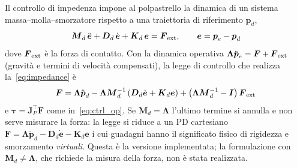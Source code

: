 Il controllo di impedenza impone al polpastrello la dinamica di un sistema massa--molla--smorzatore rispetto a una traiettoria di riferimento $\boldsymbol p_d$,
\begin{equation}
    \boldsymbol M_d\,\ddot{\boldsymbol e}+\boldsymbol D_d\,\dot{\boldsymbol e}+\boldsymbol K_d\,\boldsymbol e=\boldsymbol F_{\rm ext},\qquad \boldsymbol e=\boldsymbol p_e-\boldsymbol p_d
    \label{eq:impedance}
\end{equation}
dove $\boldsymbol F_{\rm ext}$ è la forza di contatto. Con la dinamica operativa $\boldsymbol\Lambda\ddot{\boldsymbol p}_e=\boldsymbol F+\boldsymbol F_{\rm ext}$ (gravità e termini di velocità compensati), la legge di controllo che realizza la~\eqref{eq:impedance} è
\begin{equation}
    \boldsymbol F=\boldsymbol\Lambda\ddot{\boldsymbol p}_d-\boldsymbol\Lambda\boldsymbol M_d^{-1}\left(\boldsymbol D_d\dot{\boldsymbol e}+\boldsymbol K_d\boldsymbol e\right)+\left(\boldsymbol\Lambda\boldsymbol M_d^{-1}-\boldsymbol I\right)\boldsymbol F_{\rm ext}
\end{equation}
e $\boldsymbol\tau=\boldsymbol J_P^\top\boldsymbol F$ come in~\eqref{eq:ctrl_op}. Se $\boldsymbol M_d=\boldsymbol\Lambda$ l'ultimo termine si annulla e non serve misurare la forza: la legge si riduce a un PD cartesiano $\boldsymbol F=\boldsymbol\Lambda\ddot{\boldsymbol p}_d-\boldsymbol D_d\dot{\boldsymbol e}-\boldsymbol K_d\boldsymbol e$ i cui guadagni hanno il significato fisico di rigidezza e smorzamento \emph{virtuali}. Questa è la versione implementata; la formulazione con $\boldsymbol M_d\neq\boldsymbol\Lambda$, che richiede la misura della forza, non è stata realizzata.

